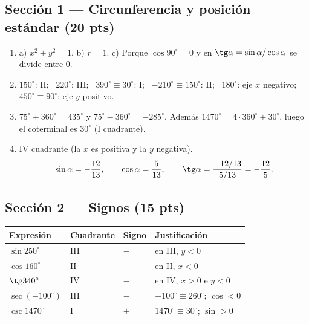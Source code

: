\documentclass[12pt, letterpaper]{article}
\providecommand{\sen}{\sin}
\begin{document}
\subsection*{Sección 1 — Circunferencia y posición estándar (20 pts)}
\begin{enumerate}[leftmargin=*, label=\textbf{\arabic*.}]
  \item a) $x^2+y^2=1$. \quad b) $r=1$. \quad c) Porque
        $\cos90^\circ=0$ y en $\tg\alpha=\sen\alpha/\cos\alpha$ se divide entre $0$.
  \item $150^\circ$: II; \ $220^\circ$: III; \ $390^\circ\equiv30^\circ$: I; \
        $-210^\circ\equiv150^\circ$: II; \ $180^\circ$: eje $x$ negativo; \
        $450^\circ\equiv90^\circ$: eje $y$ positivo.
  \item $75^\circ+360^\circ=435^\circ$ y $75^\circ-360^\circ=-285^\circ$.
        Además $1470^\circ=4\cdot360^\circ+30^\circ$, luego el coterminal es
        $30^\circ$ (I cuadrante).
  \item IV cuadrante (la $x$ es positiva y la $y$ negativa).
        \[
          \sen\alpha=-\frac{12}{13},\qquad
          \cos\alpha=\frac{5}{13},\qquad
          \tg\alpha=\frac{-12/13}{5/13}=-\frac{12}{5}.
        \]
\end{enumerate}

\subsection*{Sección 2 — Signos (15 pts)}
\begin{center}
\renewcommand{\arraystretch}{1.6}
\setlength{\tabcolsep}{9pt}
\begin{tabular}{@{}llll@{}}
  \toprule
  \textbf{Expresión} & \textbf{Cuadrante} & \textbf{Signo} & \textbf{Justificación} \\
  \midrule
  $\sen 250^\circ$    & III & $-$ & en III, $y<0$ \\
  $\cos 160^\circ$    & II  & $-$ & en II, $x<0$ \\
  $\tg 340^\circ$     & IV  & $-$ & en IV, $x>0$ e $y<0$ \\
  $\sec(-100^\circ)$  & III & $-$ & $-100^\circ\equiv260^\circ$; $\cos<0$ \\
  $\csc 1470^\circ$   & I   & $+$ & $1470^\circ\equiv30^\circ$; $\sen>0$ \\
  \bottomrule
\end{tabular}
\end{center}
\end{document}
